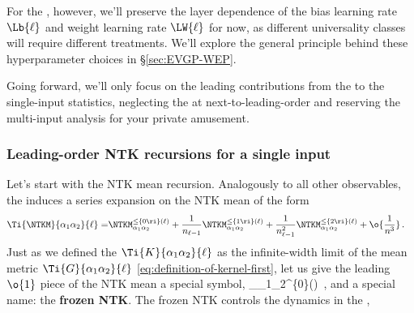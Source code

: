 For the , however, we'll preserve the layer dependence of the bias learning rate $\Lb{\ell}$ and weight learning rate $\LW{\ell}$ for now, as different universality classes will require different treatments. We'll explore the general principle behind these hyperparameter choices in \S\ref{sec:EVGP-WEP}.

Going forward, we'll only focus on the leading contributions from the  to the single-input statistics, neglecting the  at next-to-leading-order and 
reserving the multi-input analysis for your private amusement.





\subsubsection{Leading-order NTK recursions for a single input}\label{sec:NTHsummary}
Let's start with the NTK mean recursion. Analogously to all other observables, the  induces a series expansion on the NTK mean of the form
\begin{align}\label{eq:NTK-mean-expansion}
\Ti{\NTKM}{\alpha_1\alpha_2}{\ell}=&\NTKM_{\alpha_1\alpha_2}^{\le\{0\ri\}(\ell)}+\frac{1}{n_{\ell-1}}\NTKM_{\alpha_1\alpha_2}^{\le\{1\ri\}(\ell)}+\frac{1}{n_{\ell-1}^2}\NTKM_{\alpha_1\alpha_2}^{\le\{2\ri\}(\ell)}+\o{\frac{1}{n^3}}\, .
\end{align}
Just as we defined the  $\Ti{K}{\alpha_1\alpha_2}{\ell}$ as the infinite-width limit of the mean metric $\Ti{G}{\alpha_1\alpha_2}{\ell}$ \eqref{eq:definition-of-kernel-first}, let us give the leading $\o{1}$ piece of the NTK mean a special symbol,
\be\label{eq:frozen-NTK}
 \equiv \NTKM_{\alpha_1\alpha_2}^{\le\{0\ri\}(\ell)}\, ,
\ee
and a special name: the \textbf{frozen NTK}. The frozen NTK controls the  dynamics in the , %

